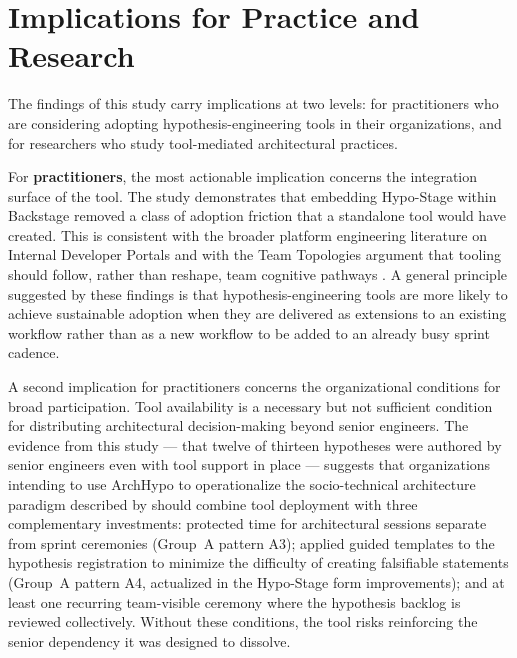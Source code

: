 \section{Implications for Practice and Research}
\label{sec:implications}

The findings of this study carry implications at two levels: for practitioners who are
considering adopting hypothesis-engineering tools in their organizations, and for
researchers who study tool-mediated architectural practices.

For \textbf{practitioners}, the most actionable implication concerns the integration
surface of the tool. The study demonstrates that embedding Hypo-Stage within Backstage 
removed a class of adoption friction that a standalone tool would have
created. This is consistent with the broader platform engineering literature on Internal
Developer Portals \citep{correa2025} and with the Team Topologies argument that tooling
should follow, rather than reshape, team cognitive pathways \citep{skelton2019}.
A general principle suggested by these findings is that hypothesis-engineering tools
are more likely to achieve sustainable adoption when they are delivered as extensions
to an existing workflow rather than as a new workflow to be added to an already busy
sprint cadence.

A second implication for practitioners concerns the organizational conditions for
broad participation. Tool availability is a necessary but not sufficient condition for
distributing architectural decision-making beyond senior engineers. The evidence from
this study --- that twelve of thirteen hypotheses were authored by senior
engineers even with tool support in place --- suggests that organizations intending to
use ArchHypo to operationalize the socio-technical architecture paradigm described by
\citet{infoq2024trends} should combine tool deployment with three complementary investments:
protected time for architectural sessions separate from sprint ceremonies
(Group~A pattern A3); applied guided templates to the hypothesis registration to minimize the difficulty of creating 
falsifiable statements (Group~A pattern A4, actualized in the Hypo-Stage
form improvements); and at least one recurring team-visible ceremony where the
hypothesis backlog is reviewed collectively. Without these conditions, the tool risks
reinforcing the senior dependency it was designed to dissolve.

